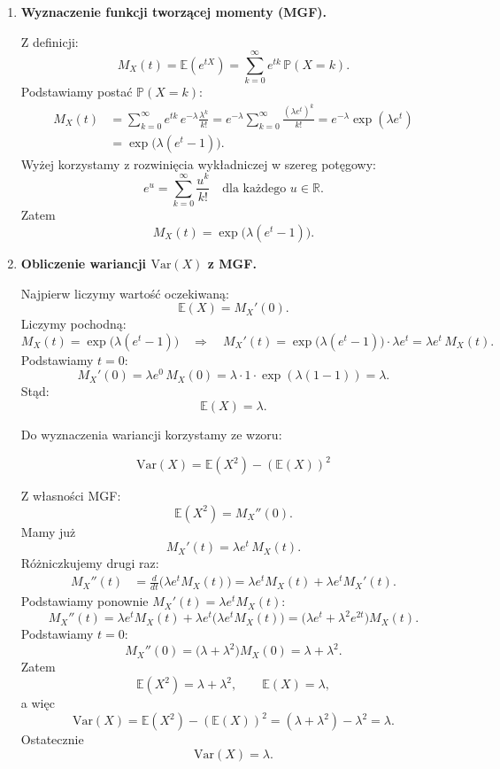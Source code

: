 \documentclass[polish, 10pt]{extarticle}
\begin{document}
\begin{enumerate}
\item[a)] \textbf{Wyznaczenie funkcji tworzącej momenty (MGF).}

Z definicji:
\[
M_X(t)=\mathbb{E}\!\left(e^{tX}\right)=\sum_{k=0}^{\infty} e^{tk}\,\mathbb{P}(X=k).
\]
Podstawiamy postać $\mathbb{P}(X=k)$:
\[
\begin{aligned}
M_X(t)
&=\sum_{k=0}^{\infty} e^{tk}\,e^{-\lambda}\frac{\lambda^k}{k!}
= e^{-\lambda}\sum_{k=0}^{\infty}\frac{(\lambda e^t)^k}{k!}
= e^{-\lambda}\exp(\lambda e^t)\\
&=\exp\!\big(\lambda(e^t-1)\big).
\end{aligned}
\]
Wyżej korzystamy z rozwinięcia wykładniczej w szereg potęgowy:
\[
e^u=\sum_{k=0}^{\infty}\frac{u^k}{k!}\quad \text{dla każdego } u\in\mathbb{R}.
\]
Zatem
\[
\boxed{M_X(t)=\exp\!\big(\lambda(e^t-1)\big).}
\]

\item[b)] \textbf{Obliczenie wariancji $\mathrm{Var}(X)$ z MGF.}

\smallskip

Najpierw liczymy wartość oczekiwaną:
\[
\mathbb{E}(X)=M_X'(0).
\]
Liczymy pochodną:
\[
M_X(t)=\exp\!\big(\lambda(e^t-1)\big)
\quad\Longrightarrow\quad
M_X'(t)=\exp\!\big(\lambda(e^t-1)\big)\cdot \lambda e^t
=\lambda e^t\,M_X(t).
\]
Podstawiamy $t=0$:
\[
M_X'(0)=\lambda e^0\,M_X(0)=\lambda\cdot 1\cdot \exp(\lambda(1-1))=\lambda.
\]
Stąd:
\[
\mathbb{E}(X)=\lambda.
\]

Do wyznaczenia wariancji korzystamy ze wzoru:

\[
\boxed{\mathrm{Var}(X)=\mathbb{E}(X^2)-(\mathbb{E}(X))^2}
\]

Z własności MGF:
\[
\mathbb{E}(X^2)=M_X''(0).
\]
Mamy już
\[
M_X'(t)=\lambda e^t\,M_X(t).
\]
Różniczkujemy drugi raz:
\[
\begin{aligned}
M_X''(t)
&=\frac{d}{dt}\big(\lambda e^t M_X(t)\big)
=\lambda e^t M_X(t)+\lambda e^t M_X'(t).
\end{aligned}
\]
Podstawiamy ponownie $M_X'(t)=\lambda e^t M_X(t)$:
\[
M_X''(t)=\lambda e^t M_X(t)+\lambda e^t\big(\lambda e^t M_X(t)\big)
=\big(\lambda e^t+\lambda^2 e^{2t}\big)M_X(t).
\]
Podstawiamy $t=0$:
\[
M_X''(0)=\big(\lambda+\lambda^2\big)M_X(0)=\lambda+\lambda^2.
\]
Zatem
\[
\mathbb{E}(X^2)=\lambda+\lambda^2,\qquad \mathbb{E}(X)=\lambda,
\]
a więc
\[
\mathrm{Var}(X)=\mathbb{E}(X^2)-(\mathbb{E}(X))^2
=(\lambda+\lambda^2)-\lambda^2=\lambda.
\]
Ostatecznie
\[
\boxed{\mathrm{Var}(X)=\lambda.}
\]

\end{enumerate}
\end{document}
